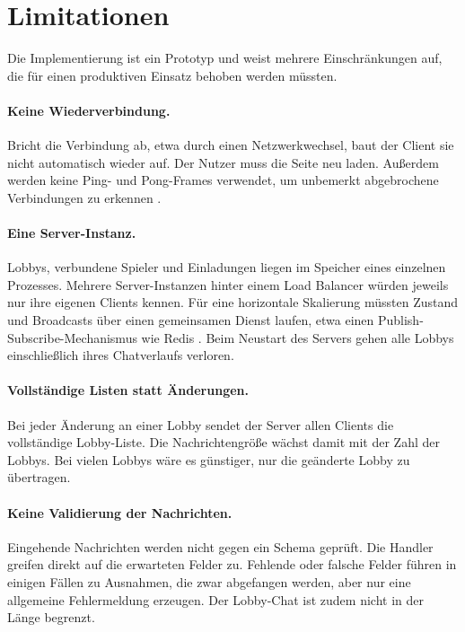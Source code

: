 \section{Limitationen}
\label{sec:limitationen}

Die Implementierung ist ein Prototyp und weist mehrere Einschränkungen auf, die für einen produktiven Einsatz behoben werden müssten.

\paragraph{Keine Wiederverbindung.} Bricht die Verbindung ab, etwa durch einen Netzwerkwechsel, baut der Client sie nicht automatisch wieder auf. Der Nutzer muss die Seite neu laden. Außerdem werden keine Ping- und Pong-Frames verwendet, um unbemerkt abgebrochene Verbindungen zu erkennen .

\paragraph{Eine Server-Instanz.} Lobbys, verbundene Spieler und Einladungen liegen im Speicher eines einzelnen Prozesses. Mehrere Server-Instanzen hinter einem Load Balancer würden jeweils nur ihre eigenen Clients kennen. Für eine horizontale Skalierung müssten Zustand und Broadcasts über einen gemeinsamen Dienst laufen, etwa einen Publish-Subscribe-Mechanismus wie Redis . Beim Neustart des Servers gehen alle Lobbys einschließlich ihres Chatverlaufs verloren.

\paragraph{Vollständige Listen statt Änderungen.} Bei jeder Änderung an einer Lobby sendet der Server allen Clients die vollständige Lobby-Liste. Die Nachrichtengröße wächst damit mit der Zahl der Lobbys. Bei vielen Lobbys wäre es günstiger, nur die geänderte Lobby zu übertragen.

\paragraph{Keine Validierung der Nachrichten.} Eingehende Nachrichten werden nicht gegen ein Schema geprüft. Die Handler greifen direkt auf die erwarteten Felder zu. Fehlende oder falsche Felder führen in einigen Fällen zu Ausnahmen, die zwar abgefangen werden, aber nur eine allgemeine Fehlermeldung erzeugen. Der Lobby-Chat ist zudem nicht in der Länge begrenzt.


